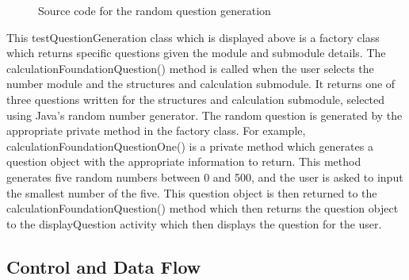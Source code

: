 \documentclass{article}
\begin{document}
\begin{figure}[H]
	\centering
	\caption{Source code for the random question generation}
	\label{figure:testQuestionGeneration}
\end{figure}

This testQuestionGeneration class which is displayed above is a factory class which returns specific questions given the module and submodule details. The calculationFoundationQuestion() method is called when the user selects the number module and the structures and calculation submodule. It returns one of three questions written for the structures and calculation submodule, selected using Java's random number generator. The random question is generated by the appropriate private method in the factory class. For example, calculationFoundationQuestionOne() is a private method which generates a question object with the appropriate information to return. This method generates five random numbers between 0 and 500, and the user is asked to input the smallest number of the five. This question object is then returned to the calculationFoundationQuestion() method which then returns the question object to the displayQuestion activity which then displays the question for the user. \par

\subsection{Control and Data Flow}
\end{document}
